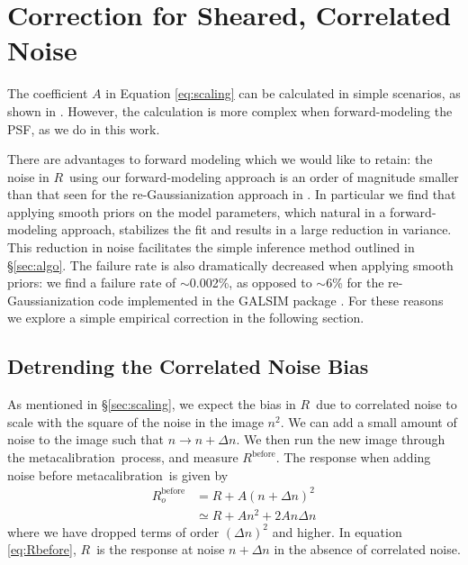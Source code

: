 \documentclass[usegraphicx,usenatbib]{mn2e}
\newcommand{\mcal}{metacalibration}
\newcommand{\mcalR}{$R$}
\begin{document}
\section{Correction for Sheared, Correlated Noise} \label{sec:corr}

The coefficient $A$ in Equation \ref{eq:scaling} can be calculated in simple
scenarios, as shown in \cite{HirataCorrNoise}.  However, the calculation is
more complex when forward-modeling the PSF, as we do in this work.

There are advantages to forward modeling which we would like to retain: the
noise in \mcalR\ using our forward-modeling approach is an order of magnitude
smaller than that seen for the re-Gaussianization approach in \cite{HuffMcal}.
In particular we find that applying smooth priors on the model parameters,
which natural in a forward-modeling approach, stabilizes the fit and results in
a large reduction in variance.  This reduction in noise facilitates the simple
inference method outlined in \S \ref{sec:algo}.  The failure rate is also
dramatically decreased when applying smooth priors:  we find a failure rate of
$\sim$0.002\%, as opposed to $\sim$6\% for the re-Gaussianization code
implemented in the GALSIM package \citep{GALSIM2015}.  For these reasons we
explore a simple empirical correction in the following section.


\subsection{Detrending the Correlated Noise Bias} \label{sec:detrend}

As mentioned in \S \ref{sec:scaling}, we expect the bias in \mcalR\ due to
correlated noise to scale with the square of the noise in the image $n^2$.  We
can add a small amount of noise to the image such that $n \rightarrow n +
\Delta n$. We then run the new image through the \mcal\ process, and measure
$R^{\mathrm{before}}$.
The response when adding noise before \mcal\ is given by
\begin{align}\label{eq:Rbefore}
    R_o^{\mathrm{before}} &= R + A (n + \Delta n)^2 \nonumber \\
       &\simeq R + A n^2 + 2 A n \Delta n
\end{align}
where we have dropped terms of order $(\Delta n)^2$ and higher.  In equation
\ref{eq:Rbefore}, \mcalR\ is the response at noise $n+\Delta n$ in the absence
of correlated noise.  
\end{document}
